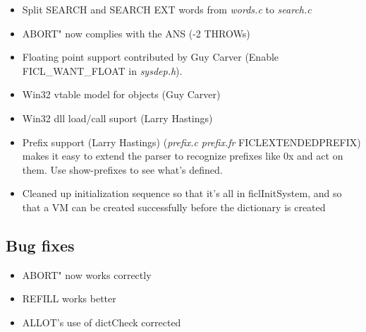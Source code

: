 \begin{itemize}[noitemsep]
	\item Split SEARCH and SEARCH EXT words from \textit{words.c}
	to \textit{search.c}

	\item ABORT" now complies with the ANS (-2 THROWs)

	\item Floating point support contributed by Guy Carver
	(Enable FICL\_WANT\_FLOAT in \textit{sysdep.h}).

	\item Win32 vtable model for objects (Guy Carver)

	\item Win32 dll load/call suport (Larry Hastings)

	\item Prefix support (Larry Hastings) (\textit{prefix.c}
	\textit{prefix.fr}
	FICL\textunderscore EXTENDED\textunderscore PREFIX) makes
	it easy to extend the parser to recognize prefixes like 0x
	and act on them. Use show-prefixes to see what's defined.

	\item Cleaned up initialization sequence so that it's all in
	ficlInitSystem, and so that a VM can be created successfully
	before the dictionary is created
\end{itemize}


\subsection*{Bug fixes}
\begin{itemize}[noitemsep]
	\item ABORT" now works correctly
	\item REFILL works better
	\item ALLOT's use of dictCheck corrected
\end{itemize}


